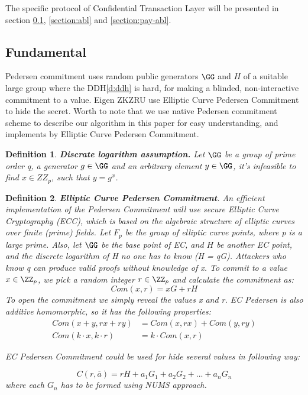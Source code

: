 \documentclass{article}
\newtheorem{myDef}{Definition}
\begin{document}
The specific protocol of Confidential Transaction Layer will be presented in section \ref{section:fundanmental}, \ref{section:abl} and \ref{section:pay-abl}.

\subsection{Fundamental} \label{section:fundanmental}

Pedersen commitment \cite{pedersen1991non} uses random public generators $\GG$ and $H$ of a suitable large group where the DDH\ref{d:ddh} is hard, for making a blinded, non-interactive commitment to a value. Eigen ZKZRU use Elliptic Curve Pedersen Commitment to hide the secret. Worth to note that we use native Pedersen commitment scheme to describe our algorithm in this paper for easy understanding, and implements by Elliptic Curve Pedersen Commitment.

\begin{myDef}
\label{d:dla}
\textbf{Discrate logarithm assumption.} Let $\GG$ be a group of prime order q, a generator $g \in \GG$ and an arbitrary element $y \in \GG$, it's infeasible to find $x \in ZZ_p$, such that $y = g^x$.
\end{myDef}

\begin{myDef}
\label{d:ecpc}
\textbf{Elliptic Curve Pedersen Commitment\cite{francca2015homomorphic}}. An efficient implementation of the Pedersen Commitment will use secure Elliptic Curve Cryptography (ECC), which is based on the algebraic structure of elliptic curves over finite (prime) fields. Let $F_p$ be the
group of elliptic curve points, where p is a large prime. Also, let $\GG$ be the base point of EC, and ${H}$ be another EC point, and the discrete logarithm of H no one has to know (H = qG). Attackers who know q can produce valid proofs without knowledge of x. To commit to a value $x \in \ZZ_p$, we pick a random integer $r \in \ZZ_p$ and calculate the commitment as:
$$
Com(x, r) = xG + rH
$$
To open the commitment we simply reveal the values x and r. EC Pedersen is also additive homomorphic, so it has the following properties:
\begin{equation}
\begin{split}
Com(x + y, rx + ry) &= Com(x, rx) + Com(y, ry) \\
Com(k \cdot x, k \cdot r) &= k \cdot Com(x, r)
\end{split}
\end{equation}

EC Pedersen Commitment could be used for hide several values in following way:

\begin{equation}
    C(r, \overline{a}) = rH + a_1G_1 + a_2G_2 + ... + a_nG_n
\end{equation}
where each $G_n$ has to be formed using NUMS\cite{black2014elliptic} approach. 

\end{myDef}
\end{document}
